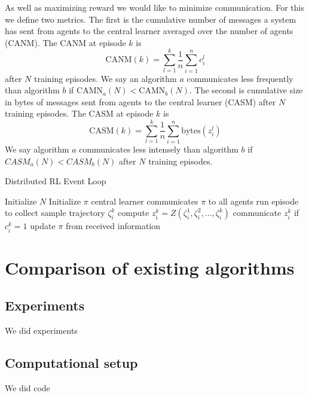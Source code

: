 As well as maximizing reward we would like to minimize communication. For this we define two metrics. The first is the cumulative number of messages a system has sent from agents to the central learner averaged over the number of agents (CANM). The CANM at episode $k$  is
\begin{equation*}
    \text{CANM}(k) = \sum_{l=1}^k \frac{1}{n} \sum_{i=1}^n c_i^l
\end{equation*} 
after $N$ training episodes. We say an algorithm $a$ communicates less frequently than algorithm $b$ if $\text{CAMN}_a(N) < \text{CAMN}_b(N)$. The second is cumulative size in bytes of messages sent from agents to the central learner (CASM) after $N$ training episodes. The CASM at episode $k$ is 
\begin{equation*}
    \text{CASM}(k) = \sum_{l=1}^k \frac{1}{n} \sum_{i=1}^n \text{bytes}(z_i^l)
\end{equation*}  
We say algorithm $a$ communicates less intensely than algorithm $b$ if $CASM_a(N) < CASM_b(N)$ after $N$ training episodes.


\begin{algorithm}
        \caption{Distributed RL Event Loop}\label{alg:EventLoop}
        \begin{algorithmic}
                \State Initialize $N$ 
                \State Initialize $\pi$
                \State central learner communicates $\pi$ to all agents
                \State run episode to collect sample trajectory $\zeta^k_i$ %
                \State compute $z^k_i = Z(\zeta^1_i,\zeta^2_i,\dots, \zeta^k_i)$
                \State communicate $z^k_i$ if $c^k_i = 1$
                \EndFor
                \State update $\pi$ from received information
                \EndFor
        \end{algorithmic}
\end{algorithm}

\section{Comparison of existing algorithms}

\subsection{Experiments}
We did experiments
\subsection{Computational setup}
We did code

